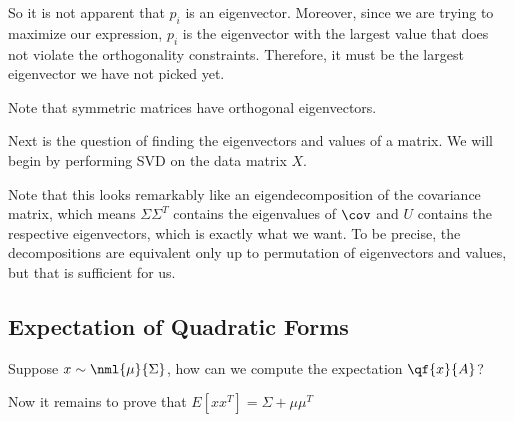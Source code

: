 \documentclass[12pt]{article}
\begin{document}
So it is not apparent that $p_i$ is an eigenvector. Moreover, since we are trying to maximize our expression, $p_i$ is the eigenvector with the largest value that does not violate the orthogonality constraints. Therefore, it must be the largest eigenvector we have not picked yet.

Note that symmetric matrices have orthogonal eigenvectors. 

Next is the question of finding the eigenvectors and values of a matrix. We will begin by performing SVD on the data matrix $X$.


Note that this looks remarkably like an eigendecomposition of the covariance matrix, which means $\Sigma \Sigma^T$ contains the eigenvalues of $\cov$ and $U$ contains the respective eigenvectors, which is exactly what we want. To be precise, the decompositions are equivalent only up to permutation of eigenvectors and values, but that is sufficient for us.

\subsection{Expectation of Quadratic Forms}

Suppose $x \sim \nml{\mu}{\Sigma}$, how can we compute the expectation $\qf{x}{A}$?


Now it remains to prove that $E[xx^T] = \Sigma + \mu\mu^T$

\end{document}
